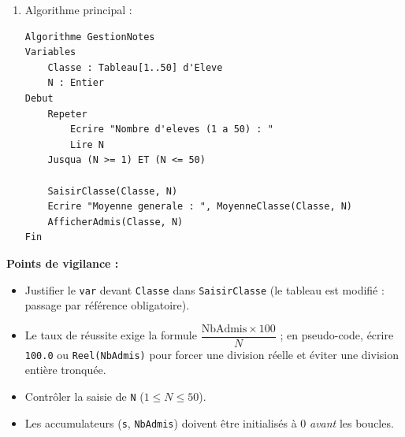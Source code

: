 \documentclass[11pt]{article}
\begin{document}
\begin{corrige}
\begin{enumerate}
\begin{lstlisting}
            Ecrire Classe[i].Matricule, " ",
                   Classe[i].Nom, " ",
                   Classe[i].Moyenne
            NbAdmis <- NbAdmis + 1
        FinSi
    FinPour
    // Attention : division reelle pour le pourcentage
    Ecrire "Taux de reussite : ",
           (NbAdmis * 100.0) / N, " %"
Fin
\end{lstlisting}
    \item Algorithme principal :
\begin{lstlisting}
Algorithme GestionNotes
Variables
    Classe : Tableau[1..50] d'Eleve
    N : Entier
Debut
    Repeter
        Ecrire "Nombre d'eleves (1 a 50) : "
        Lire N
    Jusqua (N >= 1) ET (N <= 50)

    SaisirClasse(Classe, N)
    Ecrire "Moyenne generale : ", MoyenneClasse(Classe, N)
    AfficherAdmis(Classe, N)
Fin
\end{lstlisting}
\end{enumerate}
\textbf{Points de vigilance :}
\begin{itemize}
    \item Justifier le \texttt{var} devant \texttt{Classe} dans \texttt{SaisirClasse} (le tableau est modifié : passage par référence obligatoire).
    \item Le taux de réussite exige la formule $\dfrac{\text{NbAdmis} \times 100}{N}$ ; en pseudo-code, écrire \texttt{100.0} ou \texttt{Reel(NbAdmis)} pour forcer une division réelle et éviter une division entière tronquée.
    \item Contrôler la saisie de \texttt{N} ($1 \le N \le 50$).
    \item Les accumulateurs (\texttt{s}, \texttt{NbAdmis}) doivent être initialisés à 0 \emph{avant} les boucles.
\end{itemize}
\end{corrige}
\end{document}
